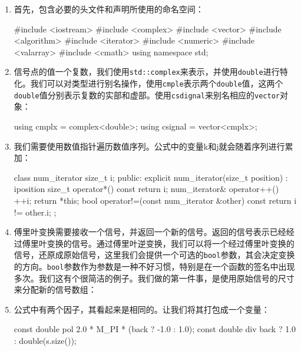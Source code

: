 \begin{enumerate}
\item 首先，包含必要的头文件和声明所使用的命名空间：

\begin{codebox}[cpp]
#include <iostream>
#include <complex>
#include <vector>
#include <algorithm>
#include <iterator>
#include <numeric>
#include <valarray>
#include <cmath>
using namespace std;
\end{codebox}

\item 信号点的值一个复数，我们使用\texttt{std::complex}来表示，并使用\texttt{double}进行特化。我们可以对类型进行别名操作，使用\texttt{cmple}表示两个\texttt{double}值，这两个\texttt{double}值分别表示复数的实部和虚部。使用\texttt{csdignal}来别名相应的\texttt{vector}对象：

\begin{codebox}[cpp]
using cmplx = complex<double>;
using csignal = vector<cmplx>;
\end{codebox}

\item 我们需要使用数值指针遍历数值序列。公式中的变量k和j就会随着序列进行累加：

\begin{codebox}[cpp]
class num_iterator {
    size_t i;
public:
    explicit num_iterator(size_t position) : i{position} {}
    size_t operator*() const { return i; }
    num_iterator& operator++() {
        ++i;
        return *this;
    }
    bool operator!=(const num_iterator &other) const {
        return i != other.i;
    }
};
\end{codebox}

\item 傅里叶变换需要接收一个信号，并返回一个新的信号。返回的信号表示已经经过傅里叶变换的信号。通过傅里叶逆变换，我们可以将一个经过傅里叶变换的信号，还原成原始信号，这里我们会提供一个可选的\texttt{bool}参数，其会决定变换的方向。\texttt{bool}参数作为参数是一种不好习惯，特别是在一个函数的签名中出现多次。我们这有个很简洁的例子。我们做的第一件事，是使用原始信号的尺寸来分配新的信号数组：

\begin{codebox}[cpp]
csignal fourier_transform(const csignal &s, bool back = false)
{
    csignal t (s.size());
\end{codebox}

\item 公式中有两个因子，其看起来是相同的。让我们将其打包成一个变量：

\begin{codebox}[cpp]
    const double pol {2.0 * M_PI * (back ? -1.0 : 1.0)};
    const double div {back ? 1.0 : double(s.size())};
\end{codebox}


\end{enumerate}
